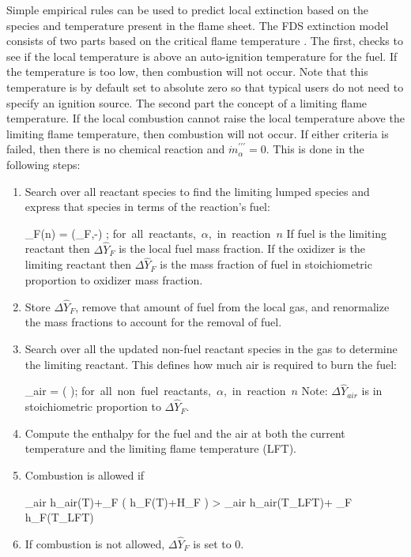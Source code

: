 Simple empirical rules can be used to predict local
extinction based on the species and temperature present in the flame sheet.  The FDS extinction model consists of two parts based on the critical flame temperature \cite{SFPE:Beyler}. The first, checks to see if the local temperature is above an auto-ignition temperature for the fuel.  If the temperature is too low, then combustion will not occur.  Note that this temperature is by default set to absolute zero so that typical users do not need to specify an ignition source.  The second part the concept of a limiting flame temperature.  If the local combustion cannot raise the local temperature above the limiting flame temperature, then combustion will not occur. If either criteria is failed, then there is no chemical reaction and $\dot{m}^{\prime\prime\prime}_{\alpha}=0$. This is done in the following steps:

\begin{enumerate}
\item Search over all reactant species to find the limiting lumped species and express that species in terms of the reaction's fuel:

\be {}_{F}(n) = \min \left (_F,-\right) \quad ; \quad \mbox{for all reactants, $\alpha$, in reaction $n$} \ee
If fuel is the limiting reactant then $\Delta \hat{Y}_{F}$ is the local fuel mass fraction. If the oxidizer is the limiting reactant then $\Delta \hat{Y}_{F}$ is the mass fraction of fuel in stoichiometric proportion to oxidizer mass fraction.
\item Store $\Delta \hat{Y}_{F}$, remove that amount of fuel from the local gas, and renormalize the mass fractions to account for the removal of fuel.
\item Search over all the updated non-fuel reactant species in the gas to determine the limiting reactant.  This defines how much air is required to burn the fuel:

\be \Delta {}_{air} = \min \left( \right); \quad \mbox{for all non fuel reactants, $\alpha$, in reaction $n$} \ee
Note: $\Delta \hat{Y}_{air}$ is in stoichiometric proportion to $\Delta \hat{Y}_{F}$.
\item Compute the enthalpy for the fuel and the air at both the current temperature and the limiting flame temperature (LFT).
\item Combustion is allowed if 

\be \Delta {}_{air} h_{air}(T)+\Delta {}_{F} \left( h_F(T)+\Delta H_F \right) > \Delta {}_{air} h_{air}(T_{LFT})+ \Delta {}_{F} h_F(T_{LFT}) \ee
\item If combustion is not allowed, $\Delta \hat{Y}_{F}$ is set to 0.
\end{enumerate}


